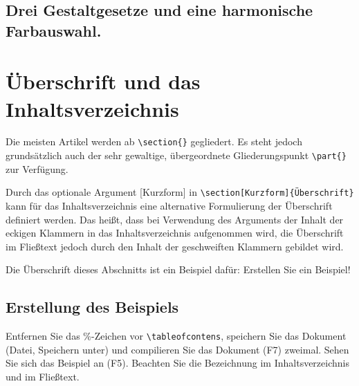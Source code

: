 \documentclass[a4paper,%
twoside,							%
headsepline = true,				%
footsepline = true,				%
headings=normal,
<<<<<<< HEAD
listof=totoc,					%
bibliography=totoc,			%
listof=entryprefix,
=======
listof = totoc,					%
bibliography = totoc,		%
listof = entryprefix,		%
>>>>>>> ff10663913a94aea2786594bebcc3acc7eb1273d
<<<<<<< HEAD
, draft
=======
>>>>>>> ff10663913a94aea2786594bebcc3acc7eb1273d
]
{scrartcl}
\begin{document}
\subsection{Drei Gestaltgesetze und eine harmonische Farbauswahl.}
\label{sec:AufgabeEinsA}

\section[Überschriften]{Überschrift und das Inhaltsverzeichnis}
Die meisten Artikel werden ab \verb#\section{}# gegliedert. Es steht jedoch grundsätzlich auch der sehr gewaltige, übergeordnete Gliederungspunkt \verb#\part{}# zur Verfügung.

Durch das optionale Argument [Kurzform] in \verb#\section[Kurzform]{Überschrift}# kann für das Inhaltsverzeichnis eine alternative Formulierung der Überschrift definiert werden. Das heißt, dass bei Verwendung des Arguments der Inhalt der eckigen Klammern in das Inhaltsverzeichnis aufgenommen wird, die Überschrift im Fließtext jedoch durch den Inhalt der geschweiften Klammern gebildet wird. 

Die Überschrift dieses Abschnitts ist ein Beispiel dafür: Erstellen Sie ein Beispiel!

\subsection{Erstellung des Beispiels}
Entfernen Sie das \%-Zeichen vor \verb#\tableofcontens#, speichern Sie das Dokument (Datei, Speichern unter) und compilieren Sie das Dokument (F7) zweimal. Sehen Sie sich das Beispiel an (F5). Beachten Sie die Bezeichnung im Inhaltsverzeichnis und im Fließtext.
\end{document}
